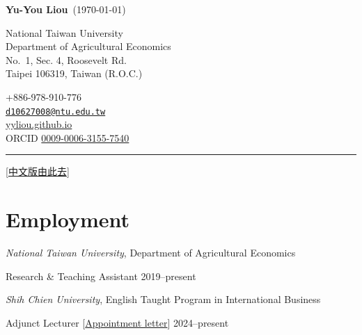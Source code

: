 \documentclass[11pt,letterpaper]{article}
\newlength{\cvindent}
\newlength{\cvcontactwidth}
\newcommand{\cvrule}{\par\noindent\hspace*{-\cvindent}%
  \rule{\dimexpr\textwidth+\cvindent\relax}{0.6pt}\par}
\begin{document}
\noindent\hspace*{-\cvindent}%
\begin{minipage}{\dimexpr\textwidth+\cvindent\relax}
  \raggedright
  {\large\bfseries Yu-You Liou}\ {\normalsize (\apstylekinda\today)}

  \vspace{3pt}

  \noindent\hspace*{\cvindent}%
  \begin{minipage}[t]{\dimexpr\linewidth-\cvindent-\cvcontactwidth-1em\relax}\small\raggedright
    National Taiwan University\\Department of Agricultural
Economics\\No.~1, Sec. 4, Roosevelt Rd.\\Taipei 106319, Taiwan (R.O.C.)
  \end{minipage}\hfill
  \begin{minipage}[t]{\cvcontactwidth}\small\raggedleft
    +886-978-910-776\\\href{mailto:d10627008@ntu.edu.tw}{\nolinkurl{d10627008@ntu.edu.tw}}\\\href{https://yyliou.github.io}{yyliou.github.io}\\ORCID
\href{https://orcid.org/0009-0006-3155-7540}{0009-0006-3155-7540}
  \end{minipage}
\end{minipage}

\vspace{6pt}
\cvrule
\vspace{-6pt}

{\raggedleft\small[\href{https://yyliou.github.io/yyliou/cv/cv_zh_simple.pdf}{中文版由此去}]\par}

\section{Employment}\label{employment}

\emph{National Taiwan University}, Department of Agricultural Economics

Research \& Teaching Assistant \hfill \mbox{2019--present}

\emph{Shih Chien University}, English Taught Program in International
Business

Adjunct Lecturer
{[}\href{https://yyliou.github.io/yyliou/cv/doc/appointment-letters.pdf}{Appointment
letter}{]} \hfill \mbox{2024--present}
\end{document}
